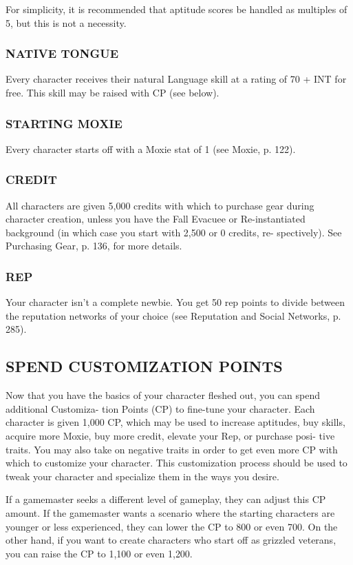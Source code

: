 For simplicity, it is recommended that aptitude
scores be handled as multiples of 5, but this is not a
necessity.

\subsubsection{NATIVE TONGUE}
Every character receives their natural Language skill
at a rating of 70 + INT for free. This skill may be
raised with CP (see below).

\subsubsection{STARTING MOXIE}
Every character starts off with a Moxie stat of 1 (see
Moxie, p. 122).

\subsubsection{CREDIT}
All characters are given 5,000 credits with which to
purchase gear during character creation, unless you
have the Fall Evacuee or Re-instantiated background
(in which case you start with 2,500 or 0 credits, re-
spectively). See Purchasing Gear, p. 136, for more
details.

\subsubsection{REP}
Your character isn’t a complete newbie. You get 50
rep points to divide between the reputation networks
of your choice (see Reputation and Social Networks,
p. 285).

\subsection{SPEND CUSTOMIZATION POINTS} %
 Now that you have the basics of your character
 fleshed out, you can spend additional Customiza-
 tion Points (CP) to fine-tune your character. Each
 character is given 1,000 CP, which may be used to
increase aptitudes, buy skills, acquire more Moxie,
buy more credit, elevate your Rep, or purchase posi-
tive traits. You may also take on negative traits in
order to get even more CP with which to customize
your character. This customization process should be
used to tweak your character and specialize them in
the ways you desire.

If a gamemaster seeks a different level of gameplay,
they can adjust this CP amount. If the gamemaster
wants a scenario where the starting characters are
younger or less experienced, they can lower the CP
to 800 or even 700. On the other hand, if you want
to create characters who start off as grizzled veterans,
you can raise the CP to 1,100 or even 1,200.

